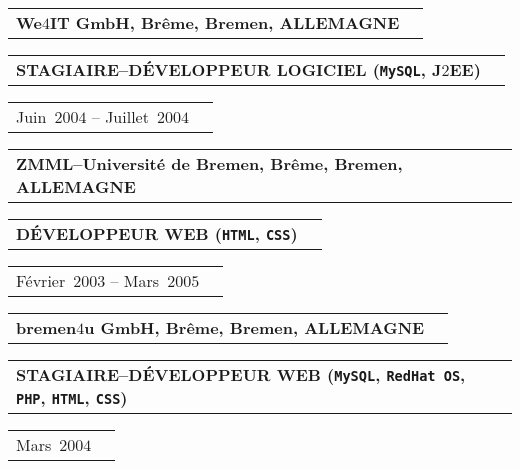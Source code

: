 \documentclass[9pt,a4paper]{article} %
\makeatletter
\newcommand{\headerrow}[2]
{\begin{tabular*}{\linewidth}{l@{\extracolsep{\fill}}r}
	#1 &
	#2 \\
\end{tabular*}}
\newcommand{\css}{\texttt{CSS}\xspace}
\newcommand{\php}{\texttt{PHP}\xspace}
\newcommand{\mysql}{\texttt{MySQL}\xspace}
\newcommand{\redhat}{\texttt{RedHat~OS}\xspace}
\newcommand{\html}{\texttt{HTML}\xspace}
\newcommand{\jtwoee}{J$2$EE\xspace}
\newcommand{\cvitemdate}[2]{#1~$#2$\xspace}
\newcommand{\cvitempositionheld}[1]{\textbf{#1}\xspace}
\makeatother
\begin{document}
\headerrow
	{\textbf{We$4$IT GmbH, Brême, Bremen, ALLEMAGNE}}	
	{}
\headerrow
	{\cvitempositionheld{STAGIAIRE--DÉVELOPPEUR LOGICIEL (\mysql, \jtwoee)}}
	{}
\headerrow
	{\cvitemdate{Juin}{2004} -- \cvitemdate{Juillet}{2004}}	
	{}
	
\vspace{0.3em}

\headerrow
	{\textbf{ZMML--Université de Bremen, Brême, Bremen, ALLEMAGNE}}	
	{}
\headerrow
	{\cvitempositionheld{DÉVELOPPEUR WEB (\html, \css)}}
	{}
\headerrow
	{\cvitemdate{Février}{2003} -- \cvitemdate{Mars}{2005}}	
	{}

\vspace{0.3em}

\headerrow
	{\textbf{bremen$4$u GmbH, Brême, Bremen, ALLEMAGNE}}	
	{}
\headerrow
	{\cvitempositionheld{STAGIAIRE--DÉVELOPPEUR WEB (\mysql, \redhat, \php, \html, \css)}}
	{}
\headerrow
	{\cvitemdate{Mars}{2004}}	
	{}	

\vspace{2em}
	
\end{document}
